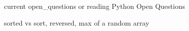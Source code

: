 current open_questions or reading
Python Open Questions

sorted vs sort, reversed, max of a random array

